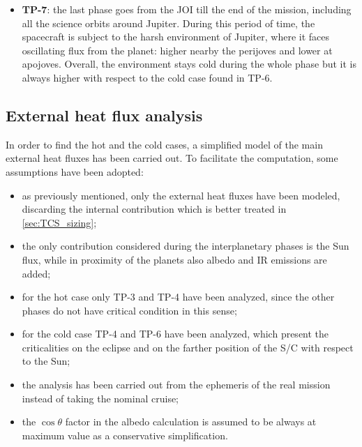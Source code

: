 \begin{itemize}
    \item \textbf{TP-7}:
    the last phase goes from the JOI till the end of the mission, including all the science orbits around Jupiter.
    During this period of time, the spacecraft is subject to the harsh environment of Jupiter, where it faces oscillating flux from the planet: higher nearby the perijoves and lower at apojoves.
    Overall, the environment stays cold during the whole phase but it is always higher with respect to the cold case found in TP-6.
    
\end{itemize}

\subsection{External heat flux analysis}
\label{subsec:heat_flux_analysis}

In order to find the hot and the cold cases, a simplified model of the main external heat fluxes has been carried out. To facilitate the computation, some assumptions have been adopted:
\begin{itemize}
    \item as previously mentioned, only the external heat fluxes have been modeled, discarding the internal contribution which is better treated in \autoref{sec:TCS_sizing};
    \item the only contribution considered during the interplanetary phases is the Sun flux, while in proximity of the planets also albedo and IR emissions are added; \\
    \item for the hot case only TP-3 and TP-4 have been analyzed, since the other phases do not have critical condition in this sense;
    \item for the cold case TP-4 and TP-6 have been analyzed, which present the criticalities on the eclipse and on the farther position of the S/C with respect to the Sun;
    \item the analysis has been carried out from the ephemeris of the real mission instead of taking the nominal cruise;
    \item the $\cos \theta$ factor in the albedo calculation is assumed to be always at maximum value as a conservative simplification.
\end{itemize}